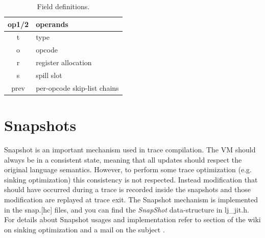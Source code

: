 \begin{table}[H]
\centering
\caption{Field definitions.}
\label{tab:ir-field}
\begin{tabular}{|c|l|}
\hline
op1/2 & operands                    \\ \hline
t     & type                        \\ \hline
o     & opcode                      \\ \hline
r     & register allocation         \\ \hline
s     & spill slot                  \\ \hline
prev  & per-opcode skip-list chains \\ \hline
\end{tabular}
\end{table}


\section{Snapshots}
\label{Sec:snap}

Snapshot is an important mechanism used in trace compilation. The VM should
always be in a consistent state, meaning that all updates should respect the
original language semantics. However, to perform some trace optimization
(e.g. sinking optimization) this consistency is not respected. Instead
modification that should have occurred during a trace is recorded inside the
snapshots and those modification are replayed at trace exit. The Snapshot
mechanism is implemented in the snap.[hc] files, and you can find the
\emph{SnapShot} data-structure in lj\_jit.h. For details about
Snapshot usages and implementation refer to section of the wiki on sinking
optimization \cite{luajit-sink} and a mail on the subject \cite{luajit-mail-1}.
